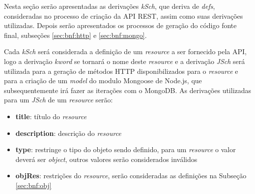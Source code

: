 Nesta seção serão apresentadas as derivações \textit{kSch}, que deriva de \textit{defs}, consideradas no processo de criação da API REST, assim como suas derivações utilizadas. Depois serão apresentados os processos de geração do código fonte final, subseções \ref{sec:bnf:http} e \ref{sec:bnf:mongo}.


\label{sec:bnf:ksch}

Cada \textit{kSch} será considerada a definição de um \textit{resource} a ser fornecido pela API, logo a derivação \textit{kword} se tornará o nome deste \textit{resource} e a derivação \textit{JSch} será utilizada para a geração de métodos HTTP disponibilizados para o \textit{resource} e para a criação de um \textit{model} do modulo Mongoose de Node.js, que subsequentemente irá fazer as iterações com o MongoDB. As derivações utilizadas para um \textit{JSch} de um \textit{resource} serão:
\begin{itemize}
    \item \textbf{title}: título do \textit{resource}
    
    \item \textbf{description}: descrição do \textit{resource}
    
    \item \textbf{type}: restringe o tipo do objeto sendo definido, para um \textit{resource} o valor deverá ser \textit{object}, outros valores serão considerados inválidos
    
    \item \textbf{objRes}: restrições do \textit{resource}, serão consideradas as definições na Subseção \ref{sec:bnf:obj}    
\end{itemize}

